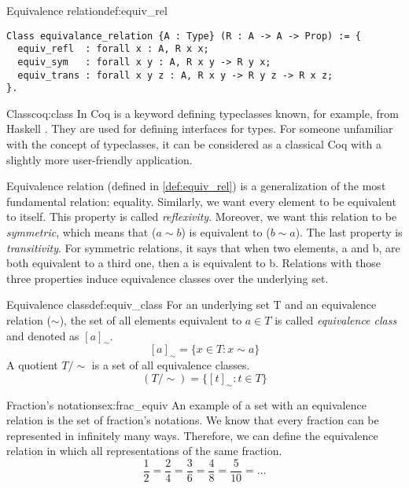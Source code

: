 \begin{defi}{Equivalence relation}{def:equiv_rel}
\begin{verbatim}
Class equivalance_relation {A : Type} (R : A -> A -> Prop) := {
  equiv_refl  : forall x : A, R x x;
  equiv_sym   : forall x y : A, R x y -> R y x;
  equiv_trans : forall x y z : A, R x y -> R y z -> R x z;
}.
\end{verbatim}
\end{defi}
\begin{coq}{Class}{coq:class}
In Coq  is a keyword defining typeclasses known, for example, from Haskell \cite{Haskell}. They are used for defining interfaces for types. For someone unfamiliar with the concept of typeclasses, it can be considered as a classical Coq  with a slightly more user-friendly application.
\end{coq}

Equivalence relation (defined in \ref{def:equiv_rel}) is a generalization of the most fundamental relation: equality. Similarly, we want every element to be equivalent to itself. This property is called \emph{reflexivity}. Moreover, we want this relation to be \emph{symmetric}, which means that ($a \sim b$) is equivalent to ($b \sim a$). The last property is \emph{transitivity}. For symmetric relations, it says that when two elements, a and b, are both equivalent to a third one, then a is equivalent to b. Relations with those three properties induce equivalence classes \cite{AbstractAlgebra} over the underlying set.

\begin{defi}{Equivalence class}{def:equiv_class}
For an underlying set T and an equivalence relation ($\sim$), the set of all elements equivalent to $a \in T$ is called \emph{equivalence class} and denoted as $[a]_\sim$.
$$ [a]_\sim = \{x \in T : x \sim a \}$$
A quotient $T / \sim$ is a set of all equivalence classes. 
$$ (T / \sim) = \{[t]_\sim : t \in T\}$$
\end{defi}

\begin{example}{Fraction's notations}{ex:frac_equiv}
An example of a set with an equivalence relation is the set of fraction's notations. We know that every fraction can be represented in infinitely many ways. Therefore, we can define the equivalence relation in which all representations of the same fraction.
$$ \frac{1}{2} = \frac{2}{4} = \frac{3}{6} = \frac{4}{8} = \frac{5}{10} = \dots$$
\end{example}

